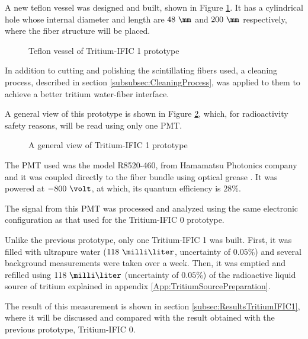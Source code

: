 A new teflon vessel was designed and built, shown in Figure \ref{fig:TeflonVesselTritumIFIC1}. It has a cylindrical hole whose internal diameter and length are $48~\mm$ and $200~\mm$ respectively, where the fiber structure will be placed. 

\begin{figure}[h]
 \centering
 \caption{Teflon vessel of Tritium-IFIC 1 prototype}
 \label{fig:TeflonVesselTritumIFIC1}
\end{figure}

In addition to cutting and polishing the scintillating fibers used, a cleaning process, described in section \ref{subsubsec:CleaningProcess}, was applied to them to achieve a better tritium water-fiber interface.

A general view of this prototype is shown in Figure \ref{fig:TritumIFIC1}, which, for radioactivity safety reasons, will be read using only one PMT.

\begin{figure}[h]
 \centering
 \caption{A general view of Tritium-IFIC 1 prototype}
 \label{fig:TritumIFIC1}
\end{figure}

The PMT used was the model R8520-460, from Hamamatsu Photonics company \cite{DataSheetPMTs} and it was coupled directly to the fiber bundle using optical grease \cite{OpticalGrease}. It was powered at $-800~\volt$, at which, its quantum efficiency is $28\%$.

The signal from this PMT was processed and analyzed using the same electronic configuration as that used for the Tritium-IFIC 0 prototype.

Unlike the previous prototype, only one Tritium-IFIC 1 was built. First, it was filled with ultrapure water ($118~\milli\liter$, uncertainty of $0.05\%$) and several background measurements were taken over a week. Then, it was emptied and refilled using $118~\milli\liter$ (uncertainty of $0.05\%$) of the radioactive liquid source of tritium explained in appendix \ref{App:TritiumSourcePreparation}.

The result of this measurement is shown in section \ref{subsec:ResultsTritiumIFIC1}, where it will be discussed and compared with the result obtained with the previous prototype, Tritium-IFIC 0.